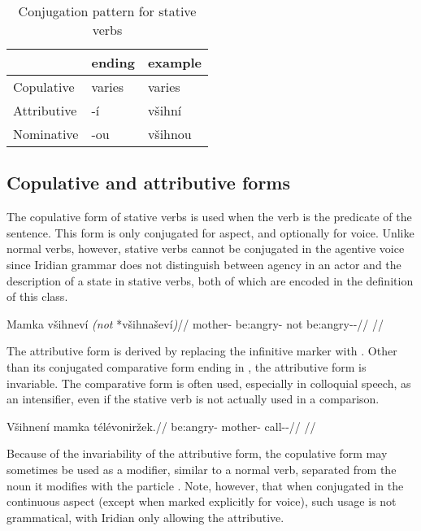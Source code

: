 \begin{table}[ht]
	\sffamily\footnotesize
	\caption{Conjugation pattern for stative verbs}
	\medskip
	\begin{tabu} to 0.7
		\toprule
		&{\sc ending}&{\sc example}\\
		\midrule
		Copulative & varies & varies\\
		Attributive & {-í} & {všihní}\\
		Nominative & {-ou}	& {všihnou}\\
		\bottomrule
	\end{tabu}
\end{table}

\subsection{Copulative and attributive forms}
The copulative form of stative verbs is used when the verb is the predicate of the sentence. This form is only conjugated for aspect, and optionally for voice. Unlike normal verbs, however, stative verbs cannot be conjugated in the agentive voice since Iridian grammar does not distinguish between agency in an actor and the description of a state in stative verbs, both of which are encoded in the definition of this class. 

\ex
\begingl
\gla Mamka všihneví \emph{(not} *všihnaševí\emph{)}//
\glb mother- be:angry- not be:angry-\Av{}-\Cont{}//
\glft {}//
\endgl
\xe


The attributive form is derived by replacing the infinitive marker  with . Other than its conjugated comparative form ending in , the attributive form is invariable. The comparative form is often used, especially in colloquial speech, as an intensifier, even if the stative verb is not actually used in a comparison.

\ex
\begingl
\gla Všihnení mamka télévoniržek.//
\glb be:angry- mother- call-\Av{}-\Pf{}//
\glft {}//
\endgl
\xe

Because of the invariability of the attributive form, the copulative form may sometimes be used as a modifier, similar to a normal verb, separated from the noun it modifies with the particle . Note, however, that when conjugated in the continuous aspect (except when marked explicitly for voice), such usage is not grammatical, with Iridian only allowing the attributive.

